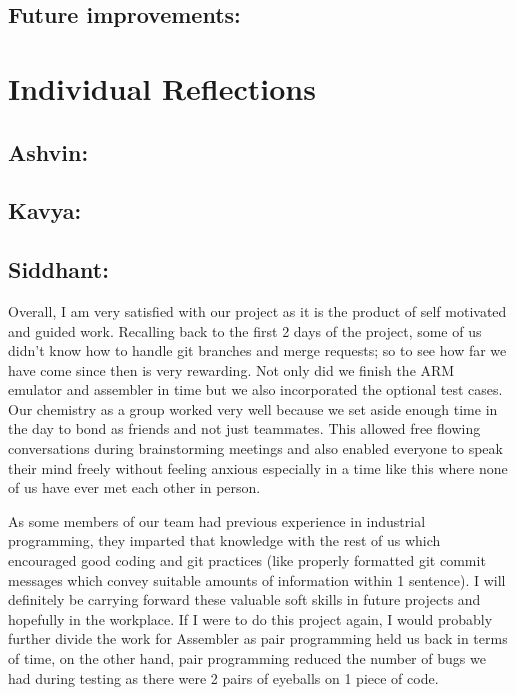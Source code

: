 \documentclass[a4paper]{article}
\begin{document}
\subsection{Future improvements:}

\section{Individual Reflections}
\subsection{Ashvin:}
\lipsum[1-1]
\subsection{Kavya:}
\lipsum[1-1]
\subsection{Siddhant:}
Overall, I am very satisfied with our project as it is the product of self motivated and guided work. Recalling back to the first 2 days of the project, some of us didn't know how to handle git branches and merge requests; so to see how far we have come since then is very rewarding. Not only did we finish the ARM emulator and assembler in time but we also incorporated the optional test cases. Our chemistry as a group worked very well because we set aside enough time in the day to bond as friends and not just teammates. This allowed free flowing conversations during brainstorming meetings and also enabled everyone to speak their mind freely without feeling anxious especially in a time like this where none of us have ever met each other in person.

As some members of our team had previous experience in industrial programming, they imparted that knowledge with the rest of us which encouraged good coding and git practices (like properly formatted git commit messages which convey suitable amounts of information within 1 sentence). I will definitely be carrying forward these valuable soft skills in future projects and hopefully in the workplace. If I were to do this project again, I would probably further divide the work for Assembler as pair programming held us back in terms of time, on the other hand, pair programming reduced the number of bugs we had during testing as there were 2 pairs of eyeballs on 1 piece of code.
\end{document}
